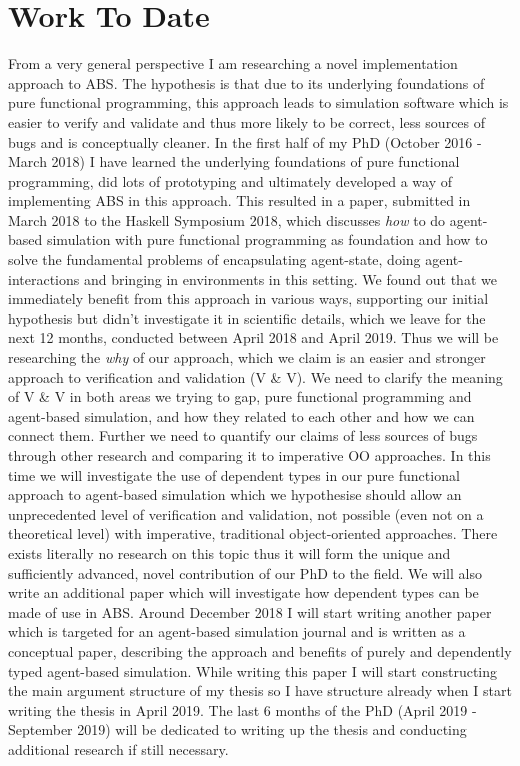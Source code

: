 \chapter{Work To Date}
\label{chap:work_to_date}

From a very general perspective I am researching a novel implementation approach to ABS. The hypothesis is that due to its underlying foundations of pure functional programming, this approach leads to simulation software which is easier to verify and validate and thus more likely to be correct, less sources of bugs and is conceptually cleaner.
In the first half of my PhD (October 2016 - March 2018) I have learned the underlying foundations of pure functional programming, did lots of prototyping and ultimately developed a way of implementing ABS in this approach. This resulted in a paper, submitted in March 2018 to the Haskell Symposium 2018, which discusses \textit{how} to do agent-based simulation with pure functional programming as foundation and how to solve the fundamental problems of encapsulating agent-state, doing agent-interactions and bringing in environments in this setting.
We found out that we immediately benefit from this approach in various ways, supporting our initial hypothesis but didn't investigate it in scientific details, which we leave for the next 12 months, conducted between April 2018 and April 2019. Thus we will be researching the \textit{why} of our approach, which we claim is an easier and stronger approach to verification and validation (V \& V). We need to clarify the meaning of V \& V in both areas we trying to gap, pure functional programming and agent-based simulation, and how they related to each other and how we can connect them. Further we need to quantify our claims of less sources of bugs through other research and comparing it to imperative OO approaches.
In this time we will investigate the use of dependent types in our pure functional approach to agent-based simulation which we hypothesise should allow an unprecedented level of verification and validation, not possible (even not on a theoretical level) with imperative, traditional object-oriented approaches. There exists literally no research on this topic thus it will form the unique and sufficiently advanced, novel contribution of our PhD to the field. We will also write an additional paper which will investigate how dependent types can be made of use in ABS.
Around December 2018 I will start writing another paper which is targeted for an agent-based simulation journal and is written as a conceptual paper, describing the approach and benefits of purely and dependently typed agent-based simulation. While writing this paper I will start constructing the main argument structure of my thesis so I have structure already when I start writing the thesis in April 2019. The last 6 months of the PhD (April 2019 - September 2019) will be dedicated to writing up the thesis and conducting additional research if still necessary.

